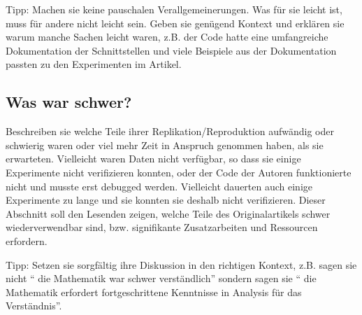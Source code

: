 \documentclass[DIV=13,fontsize=11pt]{scrartcl}
\begin{document}
Tipp: Machen sie keine pauschalen Verallgemeinerungen. Was für sie leicht ist, muss für andere nicht leicht sein. Geben sie genügend Kontext und erklären sie warum manche Sachen leicht waren, z.B. der Code hatte eine umfangreiche Dokumentation der Schnittstellen und viele Beispiele aus der Dokumentation passten zu den Experimenten im Artikel. 


\subsection{Was war schwer?}
Beschreiben sie welche Teile ihrer Replikation/Reproduktion aufwändig oder schwierig waren oder viel mehr Zeit in Anspruch genommen haben, als sie erwarteten.
Vielleicht waren Daten nicht verfügbar, so dass sie einige Experimente nicht verifizieren konnten, oder der Code der Autoren funktionierte nicht und musste erst debugged werden.
Vielleicht dauerten auch einige Experimente zu lange und sie konnten sie deshalb nicht verifizieren.
Dieser Abschnitt soll den Lesenden zeigen, welche Teile des Originalartikels schwer wiederverwendbar sind, bzw. signifikante Zusatzarbeiten und Ressourcen erfordern. 


Tipp: Setzen sie sorgfältig ihre Diskussion in den richtigen Kontext, z.B. sagen sie nicht `` die Mathematik war schwer verständlich'' sondern sagen sie `` die Mathematik erfordert fortgeschrittene Kenntnisse in Analysis für das Verständnis''.

\end{document}
